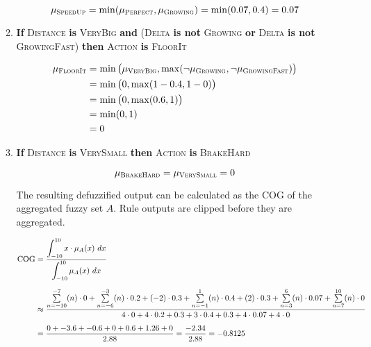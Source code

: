 \begin{enumerate}[label=\alph*)]
\begin{enumerate}[label=\textsc{Rule \arabic*}:]
\begin{displaymath}
\mu_{\textsc{SpeedUp}} = \min(\mu_{\textsc{Perfect}}, \mu_{\textsc{Growing}}) = \min(0.07, 0.4) = 0.07
\end{displaymath}

\item \textbf{If} \textsc{Distance} \textbf{is} \textsc{VeryBig} \textbf{and} \big(\textsc{Delta} \textbf{is not} \textsc{Growing} \textbf{or} \textsc{Delta} \textbf{is not} \textsc{GrowingFast}\big) \textbf{then} \textsc{Action} \textbf{is} \textsc{FloorIt}

\begin{align*}
\mu_{\textsc{FloorIt}} &= \min\big(\mu_{\textsc{VeryBig}}, \max(\neg\mu_{\textsc{Growing}}, \neg\mu_{\textsc{GrowingFast}})\big)\\
&= \min\big(0, \max(1 - 0.4, 1 - 0)\big)\\
&= \min\big(0, \max(0.6, 1)\big)\\
&= \min(0, 1)\\
&= 0
\end{align*}

\item \textbf{If} \textsc{Distance} \textbf{is} \textsc{VerySmall} \textbf{then} \textsc{Action} \textbf{is} \textsc{BrakeHard}

\begin{displaymath}
\mu_{\textsc{BrakeHard}} = \mu_{\textsc{VerySmall}} = 0
\end{displaymath}

The resulting defuzzified output can be calculated as the \ac{COG} of the aggregated fuzzy set $A$. Rule outputs are clipped before they are aggregated.


\begin{align*}
\text{COG} &= \frac{\mathlarger{\int_{-10}^{10} x \cdot \mu_A(x)~dx}}{\mathlarger{\int_{-10}^{10} \mu_A(x)~dx}}\\[0.2cm]
&\approx \frac{\sum\limits_{n=-10}^{-7}(n) \cdot 0 + \sum\limits_{n=-6}^{-3}(n) \cdot 0.2 + (-2) \cdot 0.3 + \sum\limits_{n=-1}^{1}(n) \cdot 0.4 + (2) \cdot 0.3 + \sum\limits_{n=3}^{6}(n) \cdot 0.07 + \sum\limits_{n=7}^{10}(n) \cdot 0}{4 \cdot 0 + 4 \cdot 0.2 + 0.3 + 3 \cdot 0.4 + 0.3 + 4 \cdot 0.07 + 4 \cdot 0}\\[0.2cm]
&= \frac{0 + -3.6 + -0.6 + 0 + 0.6 + 1.26 + 0}{2.88} = \frac{-2.34}{2.88} = -0.8125
\end{align*}

\end{enumerate}
\end{enumerate}



